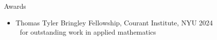 \documentclass{resume} %
\begin{document}





\begin{rSection}{Awards}
\begin{itemize}
    \item Thomas Tyler Bringley Fellowship, Courant Institute, NYU \hfill 2024\\
    $\left.\;\right.$ for outstanding work in applied mathematics
\end{itemize}
\end{rSection}
\end{document}
